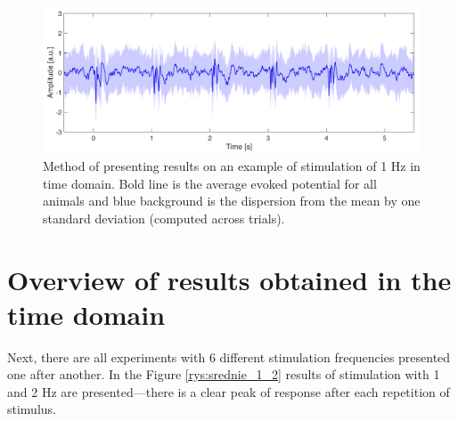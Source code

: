 \documentclass{pracalicmgr}
\begin{document}
	\begin{figure}[H]
		\centering
		\includegraphics[width=1.\linewidth]{przyklad_odch2.png}
		\caption{Method of presenting results on an example of stimulation of 1 Hz in time domain. Bold line is the average evoked potential for all animals and blue background is the dispersion from the mean by one standard deviation (computed across trials). }
		\label{rys:przyklad_odch}
	\end{figure}

    \section{Overview of results obtained in the time domain}
    \label{sec:time}
    Next, there are all experiments with 6 different stimulation frequencies presented one after another. In the Figure \ref{rys:srednie_1_2} results of stimulation with 1 and 2 Hz are presented---there is a clear peak of response after each repetition of stimulus.
    
\end{document}
